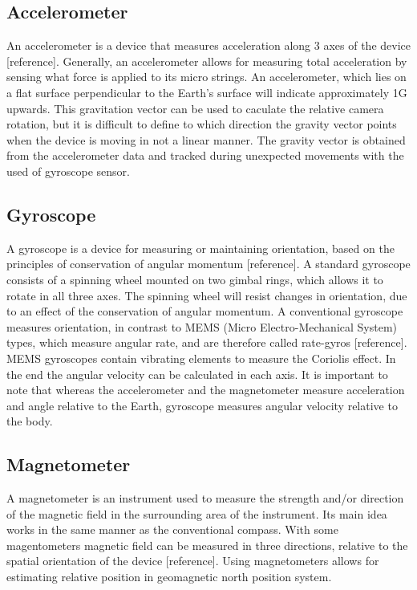 \subsection{Accelerometer}
An accelerometer is a device that measures acceleration along 3 axes of the device [reference]. Generally, an accelerometer allows for measuring total acceleration by sensing what force is applied to its micro strings. An accelerometer, which lies on a flat surface perpendicular to the Earth's surface will indicate approximately 1G upwards. This gravitation vector can be used to caculate the relative camera rotation, but it is difficult to define to which direction the gravity vector points when the device is moving in not a linear manner. The gravity vector is obtained from the accelerometer data and tracked during unexpected movements with the used of gyroscope sensor.
\subsection{Gyroscope}
A gyroscope is a device for measuring or maintaining orientation, based on the principles of conservation of angular momentum [reference]. A standard gyroscope consists of a spinning wheel mounted on two gimbal rings, which allows it to rotate in all three axes. The spinning wheel will resist changes in orientation, due to an effect of the conservation of angular momentum. A conventional gyroscope measures orientation, in contrast to MEMS (Micro Electro-Mechanical System) types, which measure
angular rate, and are therefore called rate-gyros [reference]. MEMS gyroscopes contain vibrating elements to measure the Coriolis effect. In the end the angular velocity can be calculated in each axis. It is important to note that whereas the accelerometer and the magnetometer measure acceleration and angle relative to the Earth, gyroscope measures angular velocity
relative to the body.
\subsection{Magnetometer}
A magnetometer is an instrument used to measure the strength and/or direction of the magnetic field in the surrounding area of the instrument. Its main idea works in the same manner as the conventional compass. With some magentometers magnetic field can be measured in three directions, relative to the spatial orientation of the device [reference]. Using magnetometers allows for estimating relative position in geomagnetic north position system. 
